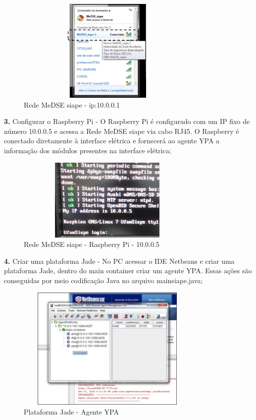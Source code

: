 \documentclass[10pt,letterpaper,twocolumn]{IEEEtran}
\begin{document}
\begin{figure}[!h]
	\centering
	\includegraphics[width=8.9cm, height=5cm]{MeDSE_imagens/F107_SIAPE_MeDSE_siape.jpg} 
	\caption{Rede MeDSE siape - ip:10.0.0.1}
	\label{F107}
\end{figure}

\textbf{3.} Configurar o Raspberry Pi -
O Raspberry Pi é configurado com um IP fixo de número 10.0.0.5 e acessa a Rede MeDSE siape via cabo RJ45. O Raspberry é conectado diretamente à interface elétrica e fornecerá ao agente YPA a informação dos módulos presentes na interface  elétrica;


\begin{figure}[!h]
	\centering
	\includegraphics[width=8.9cm, height=4cm]{MeDSE_imagens/F108_SIAPE_RPI.jpg} 
	\caption{Rede MeDSE siape - Raspberry Pi - 10.0.0.5}
	\label{F108}
\end{figure}


\textbf{4.} Criar uma plataforma Jade -
No PC acessar o IDE Netbeans e criar uma plataforma Jade, dentro do main container criar um agente YPA. Essas ações são conseguidas por meio codificação Java no arquivo mainsiape.java;

\begin{figure}[!h]
	\centering
	\includegraphics[width=8.9cm, height=6cm]{MeDSE_imagens/F109_SIAPE_YPA.jpg} 
	\caption{Plataforma Jade - Agente YPA}
	\label{F109}
\end{figure}
\end{document}
